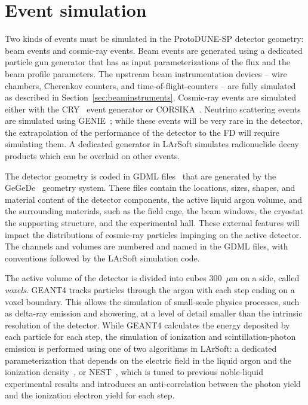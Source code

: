 \section{Event simulation}
\label{sec:larsoftsim}

Two kinds of events must be simulated in the ProtoDUNE-SP detector
geometry: beam events and cosmic-ray events.  Beam events are
generated using a dedicated particle gun generator that has as input
parameterizations of the flux and the beam profile parameters.
The upstream beam instrumentation devices -- wire chambers, Cherenkov
counters, and time-of-flight-counters -- are fully simulated as described in
Section~\ref{sec:beaminstruments}. Cosmic-ray
events are simulated either with the CRY~\cite{cry, cry2} event generator or
CORSIKA~\cite{Heck:1998vt}.  Neutrino scattering events are simulated
using GENIE~\cite{Andreopoulos:2009rq}; while these %
events will be very
rare in the detector, the extrapolation of the performance of
the \pdsp
detector to the FD will require simulating them. %
A dedicated generator in LArSoft simulates
radionuclide decay products which can be overlaid on other events.

The detector geometry is coded in GDML files~\cite{Agostinelli:2002hh} that are
generated by the GeGeDe~\cite{gegede} 
geometry system.  These files
contain the locations, sizes, shapes, and material content of the
detector components, the active liquid argon volume, and the
surrounding materials, such as the field cage, the beam windows, the
cryostat the supporting structure, and the experimental hall.  These
external features will impact the distributions of cosmic-ray
particles impinging on the active detector.  The channels and volumes
are numbered and named in the GDML files, with conventions followed by
the LArSoft simulation code.

The active volume of the detector is divided into cubes 300~$\mu$m on
a side, called \textit{voxels}.  GEANT4 tracks particles through the argon with
each step ending on a voxel boundary. This allows the simulation of small-scale
physics processes, such as delta-ray emission and showering, at a level
of detail smaller than the intrinsic resolution of the detector.   While GEANT4
calculates the energy deposited by each particle for each step, the
simulation of ionization and scintillation-photon emission 
is performed using one of two algorithms in LArSoft:  a dedicated parameterization that
depends on the electric field in the liquid argon and the ionization
density~\cite{Birks:1964zz}, or  NEST~\cite{Szydagis:2011tk}, which is tuned to
previous noble-liquid experimental results and introduces an
anti-correlation between the photon yield and the ionization electron
yield for each step.  

